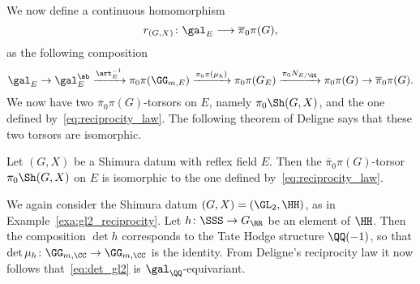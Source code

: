 We now define a continuous homomorphism
\begin{equation}\label{eq:reciprocity_law}
r_{(G,X)}\colon \gal_{E} \longrightarrow \overline{\pi}_0 \pi(G),
\end{equation}
as the following composition
$$
 \gal_E \rightarrow \gal_E^{\ab} \xrightarrow{\art_E^{-1}} \pi_0 \pi(\GG_{m,E}) \xrightarrow{\pi_0 \pi(\mu_h)} \pi_0 \pi(G_E) \xrightarrow{\pi_0 N_{E/\QQ}} \pi_0 \pi(G) \rightarrow \overline{\pi}_0 \pi(G).
$$
%
%
We now have two $\overline{\pi}_0 \pi(G)$-torsors on $E$, namely $\pi_0 \Sh(G,X)$, and the one defined by~\eqref{eq:reciprocity_law}. The following theorem of Deligne says that these two torsors are isomorphic.

\begin{theorem}\label{thm:deligne_reciprocity}
Let $(G,X)$ be a Shimura datum with reflex field $E$. Then the $\overline{\pi}_0 \pi(G)$-torsor $\pi_0 \Sh(G,X)$ on $E$ is isomorphic to the one defined by~\eqref{eq:reciprocity_law}.
\end{theorem}

\begin{example}\label{exa:final_gl2}
    We again consider the Shimura datum $(G,X) = (\GL_2,\HH)$, as in Example~\ref{exa:gl2_reciprocity}. Let $h\colon \SSS \rightarrow G_{\RR}$ be an element of $\HH$. Then the composition $\det h$ corresponds to the Tate Hodge structure $\QQ(-1)$, so that $\det \mu_h\colon \GG_{m,\CC} \rightarrow \GG_{m,\CC}$ is the identity. From Deligne's reciprocity law it now follows that~\eqref{eq:det_gl2} is $\gal_{\QQ}$-equivariant.
\end{example}

